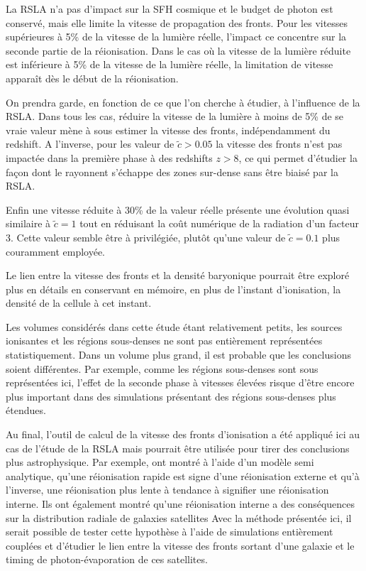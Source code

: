 La \ac{RSLA} n'a pas d'impact sur la \ac{SFH} cosmique et le budget de photon est conservé, mais elle limite la vitesse de propagation des fronts.
Pour les vitesses supérieures à 5\% de la vitesse de la lumière réelle, l'impact ce concentre sur la seconde partie de la réionisation.
Dans le cas où la vitesse de la lumière réduite est inférieure à 5\% de la vitesse de la lumière réelle, la limitation de vitesse apparaît dès le début de la réionisation. %

On prendra garde, en fonction de ce que l'on cherche à étudier, à l'influence de la \ac{RSLA}.
Dans tous les cas, réduire la vitesse de la lumière à moins de 5\% de se vraie valeur mène à sous estimer la vitesse des fronts, indépendamment du redshift.
A l'inverse, pour les valeur de $\tilde{c} > 0.05$ la vitesse des fronts n'est pas impactée dans la première phase à des redshifts $z>8$, ce qui permet d'étudier la façon dont le rayonnent s’échappe des zones sur-dense sans être biaisé par la \ac{RSLA}.

Enfin une vitesse réduite à 30\% de la valeur réelle présente une évolution quasi similaire à $\tilde{c}=1$ tout en réduisant la coût numérique de la radiation d'un facteur 3.
Cette valeur semble être à privilégiée, plutôt qu'une valeur de $\tilde{c}=0.1$ plus couramment employée.

Le lien entre la vitesse des fronts et la densité baryonique pourrait être exploré plus en détails en conservant en mémoire, en plus de l'instant d'ionisation, la densité de la cellule à cet instant.

Les volumes considérés dans cette étude étant relativement petits, les sources ionisantes et les régions sous-denses ne sont pas entièrement représentées statistiquement.
Dans un volume plus grand, il est probable que les conclusions soient différentes.
Par exemple, comme les régions sous-denses sont sous représentées ici, l'effet de la seconde phase à vitesses élevées risque d'être encore plus important dans des simulations présentant des régions sous-denses plus étendues.

Au final, l'outil de calcul de la vitesse des fronts d'ionisation a été appliqué ici au cas de l'étude de la \ac{RSLA} mais pourrait être utilisée pour tirer des conclusions plus astrophysique.
Par exemple, \citep{2011MNRAS.417L..93O} ont montré à l'aide d'un modèle semi analytique, qu'une réionisation rapide est signe d'une réionisation externe et qu'à l'inverse, une réionisation plus lente à tendance à signifier une réionisation interne.
Ils ont également montré qu'une réionisation interne a des conséquences sur la distribution radiale de galaxies satellites 
Avec la méthode présentée ici, il serait possible de tester cette hypothèse à l'aide de simulations entièrement couplées et d'étudier le lien entre la vitesse des fronts sortant d'une galaxie et le timing de photon-évaporation de ces satellites.

